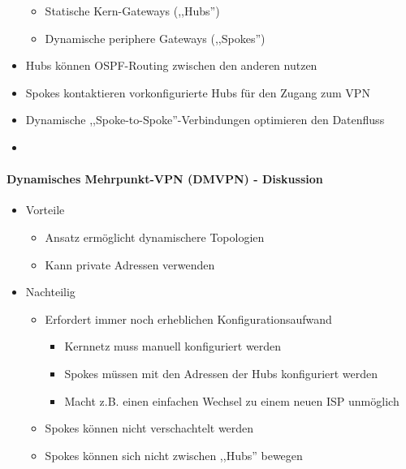 \documentclass[a4paper]{article}
\begin{document}
\begin{multicols}{3}
\begin{itemize}
              \begin{itemize}
                  \item
                        Statische Kern-Gateways (,,Hubs'')
                  \item
                        Dynamische periphere Gateways (,,Spokes'')
              \end{itemize}
        \item
              Hubs können OSPF-Routing zwischen den anderen nutzen
        \item
              Spokes kontaktieren vorkonfigurierte Hubs für den Zugang zum VPN
        \item
              Dynamische ,,Spoke-to-Spoke''-Verbindungen optimieren den Datenfluss
        \item
    \end{itemize}


    \paragraph{Dynamisches Mehrpunkt-VPN (DMVPN) -
        Diskussion}

    \begin{itemize}
        \item
              Vorteile

              \begin{itemize}
                  \item
                        Ansatz ermöglicht dynamischere Topologien
                  \item
                        Kann private Adressen verwenden
              \end{itemize}
        \item
              Nachteilig

              \begin{itemize}
                  \item
                        Erfordert immer noch erheblichen Konfigurationsaufwand

                        \begin{itemize}
                            \item
                                  Kernnetz muss manuell konfiguriert werden
                            \item
                                  Spokes müssen mit den Adressen der Hubs konfiguriert werden
                            \item
                                  Macht z.B. einen einfachen Wechsel zu einem neuen ISP unmöglich
                        \end{itemize}
                  \item
                        Spokes können nicht verschachtelt werden
                  \item
                        Spokes können sich nicht zwischen ,,Hubs'' bewegen


\end{itemize}
\end{itemize}
\end{multicols}
\end{document}
